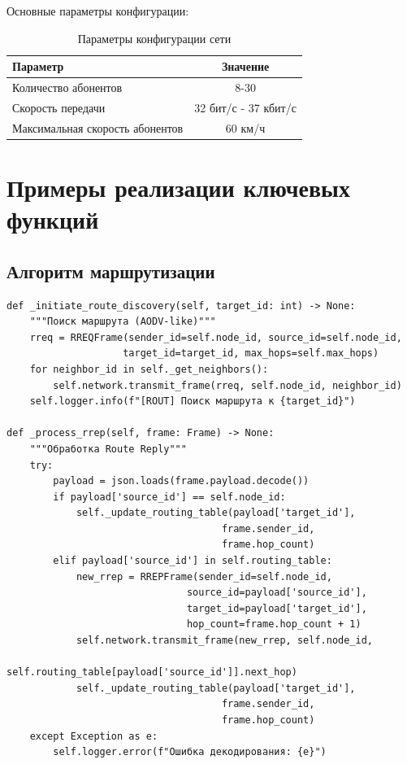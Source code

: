 Основные параметры конфигурации:

\begin{table}[h]
\centering
\begin{tabular}{|l|c|}
\hline
Параметр & Значение \\ \hline
Количество абонентов & 8-30 \\
Скорость передачи & 32 бит/с - 37 кбит/с \\
Максимальная скорость абонентов & 60 км/ч \\ \hline
\end{tabular}
\caption{Параметры конфигурации сети}
\label{tab:network-config}
\end{table}

\section{Примеры реализации ключевых функций}

\subsection{Алгоритм маршрутизации}

\begin{verbatim}
def _initiate_route_discovery(self, target_id: int) -> None:
    """Поиск маршрута (AODV-like)"""
    rreq = RREQFrame(sender_id=self.node_id, source_id=self.node_id,
                    target_id=target_id, max_hops=self.max_hops)
    for neighbor_id in self._get_neighbors():
        self.network.transmit_frame(rreq, self.node_id, neighbor_id)
    self.logger.info(f"[ROUT] Поиск маршрута к {target_id}")

def _process_rrep(self, frame: Frame) -> None:
    """Обработка Route Reply"""
    try:
        payload = json.loads(frame.payload.decode())
        if payload['source_id'] == self.node_id:
            self._update_routing_table(payload['target_id'],
                                     frame.sender_id,
                                     frame.hop_count)
        elif payload['source_id'] in self.routing_table:
            new_rrep = RREPFrame(sender_id=self.node_id,
                               source_id=payload['source_id'],
                               target_id=payload['target_id'],
                               hop_count=frame.hop_count + 1)
            self.network.transmit_frame(new_rrep, self.node_id,
                                      self.routing_table[payload['source_id']].next_hop)
            self._update_routing_table(payload['target_id'],
                                     frame.sender_id,
                                     frame.hop_count)
    except Exception as e:
        self.logger.error(f"Ошибка декодирования: {e}")
\end{verbatim}


